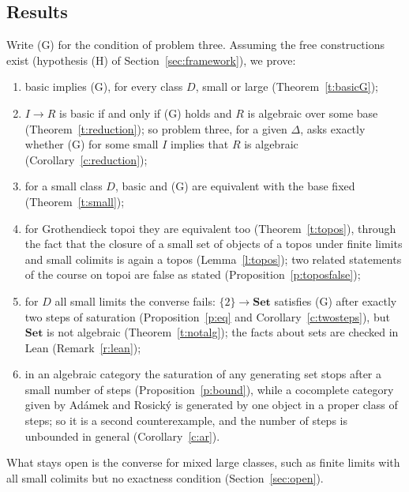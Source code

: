 \documentclass[11pt,a4paper]{amsart}
\theoremstyle{definition}
\theoremstyle{remark}
\newcommand{\Set}{\mathbf{Set}}
\begin{document}
\subsection*{Results}
Write (G) for the condition of problem three. Assuming the free constructions exist (hypothesis (H) of Section~\ref{sec:framework}), we prove:
\begin{enumerate}
\item basic implies (G), for every class $D$, small or large (Theorem~\ref{t:basicG});
\item $I\to R$ is basic if and only if (G) holds and $R$ is algebraic over some base (Theorem~\ref{t:reduction}); so problem three, for a given $\Delta$, asks exactly whether (G) for some small $I$ implies that $R$ is algebraic (Corollary~\ref{c:reduction});
\item for a small class $D$, basic and (G) are equivalent with the base fixed (Theorem~\ref{t:small});
\item for Grothendieck topoi they are equivalent too (Theorem~\ref{t:topos}), through the fact that the closure of a small set of objects of a topos under finite limits and small colimits is again a topos (Lemma~\ref{l:topos}); two related statements of the course on topoi are false as stated (Proposition~\ref{p:toposfalse});
\item for $D$ all small limits the converse fails: $\{2\}\to\Set$ satisfies (G) after exactly two steps of saturation (Proposition~\ref{p:eq} and Corollary~\ref{c:twosteps}), but $\Set$ is not algebraic (Theorem~\ref{t:notalg}); the facts about sets are checked in Lean (Remark~\ref{r:lean});
\item in an algebraic category the saturation of any generating set stops after a small number of steps (Proposition~\ref{p:bound}), while a cocomplete category given by Adámek and Rosický is generated by one object in a proper class of steps; so it is a second counterexample, and the number of steps is unbounded in general (Corollary~\ref{c:ar}).
\end{enumerate}
What stays open is the converse for mixed large classes, such as finite limits with all small colimits but no exactness condition (Section~\ref{sec:open}).
\end{document}
